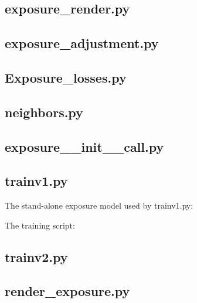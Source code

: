 \documentclass[11pt,a4paper]{article}
\begin{document}


\subsection{exposure\_render.py}



\subsection{exposure\_adjustment.py}



\subsection{Exposure\_losses.py}



\subsection{neighbors.py}



\subsection{exposure\_\_init\_\_call.py}



\subsection{trainv1.py}

The stand-alone exposure model used by trainv1.py:



The training script:



\subsection{trainv2.py}



\subsection{render\_exposure.py}
\end{document}
